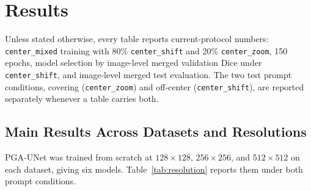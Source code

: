 \section{Results}
\label{sec:results}
Unless stated otherwise, every table reports current-protocol numbers: \texttt{center\_mixed} training with 80\% \texttt{center\_shift} and 20\% \texttt{center\_zoom}, 150 epochs, model selection by image-level merged validation Dice under \texttt{center\_shift}, and image-level merged test evaluation. The two test prompt conditions, covering (\texttt{center\_zoom}) and off-center (\texttt{center\_shift}), are reported separately whenever a table carries both.

\subsection{Main Results Across Datasets and Resolutions}
\label{sec:main}
PGA-UNet was trained from scratch at $128\times128$, $256\times256$, and $512\times512$ on each dataset, giving six models. Table~\ref{tab:resolution} reports them under both prompt conditions.

\begin{table}[t]
\caption{PGA-UNet across resolutions, image-level merged. Dice, IoU, CBL and HD95 (native px and normalized $\mathrm{HD95}/(\sqrt{2}\,S)$) given as covering / off-center.}
\label{tab:resolution}
\centering
\scriptsize
{}
\end{table}

